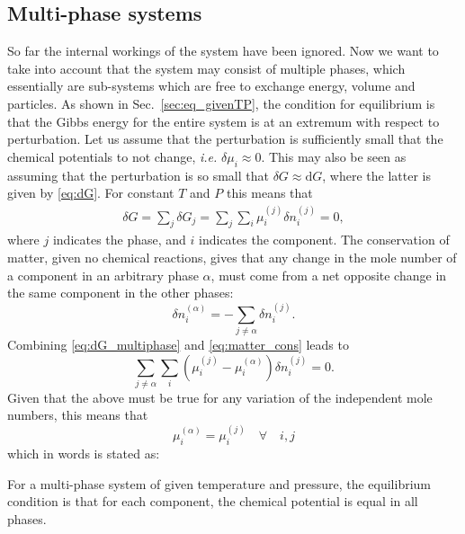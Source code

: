 \documentclass[english]{../thermomemo/thermomemo}
\newcommand{\dd}[1]{\mathrm{d}{#1}}
\begin{document}
\subsection{Multi-phase systems}
\label{sec:eq_multiphase}
So far the internal workings of the system have been ignored. Now we want to take into account that the system may consist of multiple phases, 
which essentially are sub-systems which are free to exchange energy, volume and particles.
As shown in Sec.~\ref{sec:eq_givenTP}, the condition for equilibrium is that the Gibbs energy for the entire system is at an extremum with respect to perturbation. 
Let us assume that the perturbation is sufficiently small that the chemical potentials to not change, \textit{i.e.} $\delta \mu_i \approx 0$. This may also be seen as 
assuming that the perturbation is so small that $\delta G \approx \dd{G}$, where the latter is given by \eqref{eq:dG}.
For constant $T$ and $P$ this means that 
\begin{align}
  \delta G = \sum_j \delta G_j = \sum_j \sum_i \mu_i^{(j)} \delta n_i^{(j)} = 0,
  \label{eq:dG_multiphase}
\end{align}
where $j$ indicates the phase, and $i$ indicates the component. The conservation of matter, given no chemical reactions, 
gives that any change in the mole number of a component in an arbitrary phase $\alpha$, must come from a net opposite change in the same 
component in the other phases:
\begin{equation}
  \delta n_i^{(\alpha)}  = - \sum_{j\neq \alpha} \delta n_i^{(j)}.
  \label{eq:matter_cons}
\end{equation}
Combining \eqref{eq:dG_multiphase} and \eqref{eq:matter_cons} leads to 
\begin{equation}
  \sum_{j\neq \alpha} \sum_i \left( \mu_i^{(j)} - \mu_i^{(\alpha)} \right) \delta n_i^{(j)} = 0.
  \label{}
\end{equation}
Given that the above must be true for any variation of the independent mole numbers, this means that 
\begin{equation}
  \mu_i^{(\alpha)} = \mu_i^{(j)} \quad \forall \quad  i,j
  \label{}
\end{equation}
which in words is stated as:
\begin{framed}
  \noindent
  For a multi-phase system of given temperature and pressure, the equilibrium condition is that for each component, the chemical potential 
  is equal in all phases.
\end{framed}
\end{document}
